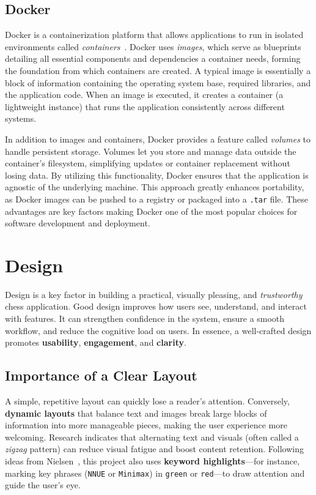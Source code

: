 \documentclass[12pt,a4paper]{article}
\begin{document}
\subsection{Docker}
Docker is a containerization platform that allows applications to run in isolated environments
called \emph{containers}~\cite{DockerDocs}. Docker uses \emph{images}, which serve as blueprints
detailing all essential components and dependencies a container needs, forming the foundation from
which containers are created. A typical image is essentially a block of information containing the
operating system base, required libraries, and the application code. When an image is executed, it
creates a container (a lightweight instance) that runs the application consistently across different
systems.

In addition to images and containers, Docker provides a feature called \emph{volumes} to handle
persistent storage. Volumes let you store and manage data outside the container's filesystem,
simplifying updates or container replacement without losing data. By utilizing this functionality,
Docker ensures that the application is agnostic of the underlying machine. This approach greatly
enhances portability, as Docker images can be pushed to a registry or packaged into a \texttt{.tar}
file. These advantages are key factors making Docker one of the most popular choices for software
development and deployment.



\section{Design}
\label{sec:design}

Design is a key factor in building a practical, visually pleasing, 
and \emph{trustworthy} chess application. Good design improves how 
users see, understand, and interact with features. It can strengthen 
confidence in the system, ensure a smooth workflow, and reduce 
the cognitive load on users. In essence, a well-crafted design 
promotes \textbf{usability}, \textbf{engagement}, and \textbf{clarity}.

\subsection{Importance of a Clear Layout}
A simple, repetitive layout can quickly lose a reader’s attention. 
Conversely, \textbf{dynamic layouts} that balance text and images 
break large blocks of information into more manageable pieces, 
making the user experience more welcoming. Research indicates 
\cite{dombrowski2008layout} that alternating text and visuals 
(often called a \emph{zigzag} pattern) can reduce visual fatigue 
and boost content retention. Following ideas from 
Nielsen~\cite{nielsen2006usability}, this project also uses 
\textbf{keyword highlights}—for instance, marking key phrases 
(\texttt{NNUE} or \texttt{Minimax}) in \texttt{green} or 
\texttt{red}—to draw attention and guide the user’s eye.
\end{document}
